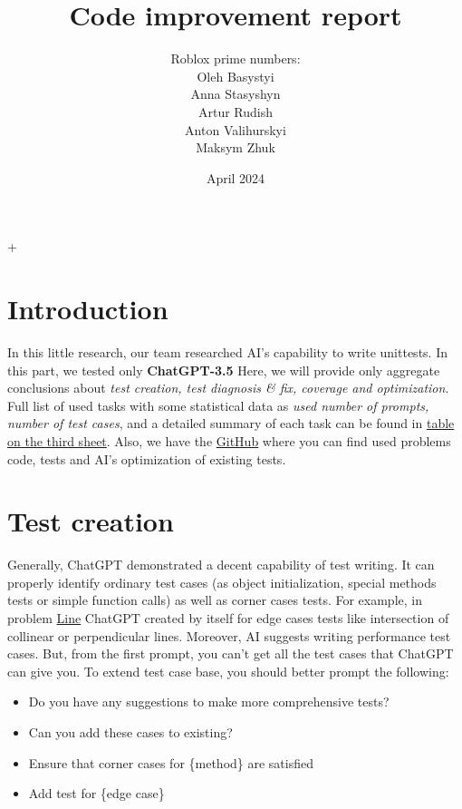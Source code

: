 \documentclass[12pt]{report}
\title{Code improvement report}
\author{Roblox prime numbers:\\\small{Oleh Basystyi}\\\small{Anna Stasyshyn}
	\\\small{Artur Rudish}\\\small{Anton Valihurskyi}\\\small{Maksym Zhuk}}
\date{April 2024}
\begin{document}
	\maketitle
	\renewcommand{\thesection}{\arabic{section}}+
	\section{Introduction}
		
			In this little research, our team researched AI’s capability to write unittests.
In this part, we tested only \textbf{ChatGPT-3.5} Here, we will provide only aggregate
conclusions about \textit{test creation, test diagnosis \& fix, coverage and optimization}. Full list of
used tasks with some statistical data as \textit{used number of prompts, number of test cases}, and a detailed summary of each task can be found in
		\href{https://docs.google.com/spreadsheets/d/1qXPyAJsOOpmtxIoGqObwG5mTaLU3IWO0SQRGbjZPhEc/edit#gid=0}{table on the third sheet}. Also, we have the \href{https://github.com/n1n1n1q/Ai-benchmark/tree/main/Ai-tests/Tests-Writing}{GitHub} where you can find used problems code, tests and AI's optimization of existing tests.
		
	\section{Test creation}
		Generally, ChatGPT demonstrated a decent capability of test writing. It can properly identify ordinary test cases (as object initialization, special methods tests or simple function calls) as well as corner cases tests. 
For example, in problem \href{https://cms.ucu.edu.ua/mod/vpl/view.php?id=356223}{Line} ChatGPT created
by itself for edge cases tests like intersection of collinear or perpendicular lines. Moreover, AI suggests 
writing performance test cases. But, from the first prompt, you can't get all the test cases that ChatGPT can give you.
To extend test case base, you should better prompt the following:
		
		\begin{itemize}
			\item Do you have any suggestions to make more comprehensive tests?
			\item Can you add these cases to existing?
			\item Ensure that corner cases for \{method\} are satisfied
			\item Add test for \{edge case\}
		\end{itemize}
		
\end{document}
